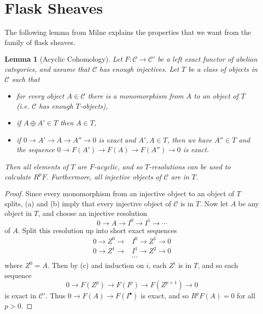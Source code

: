 \documentclass[letterpaper,11pt]{article}
\newtheorem{lem}{Lemma}
\theoremstyle{definition}
\theoremstyle{remark}
\begin{document}
\section{Flask Sheaves}

The following lemma from Milne \cite{milne} explains the properties that we want from the family of flask sheaves.

\begin{lem}[Acyclic Cohomology]\label{acyclic} Let $F:\mathcal{C}\rightarrow \mathcal{C}'$ be a left exact functor of abelian categories, and assume that $\mathcal{C}$ has enough injectives. Let $T$ be a class of objects in $\mathcal{C}$ such that
\begin{itemize}
\item[{\rm (a)}] for every object $A\in \mathcal{C}$ there is a monomorphism from $A$ to an object of $T$ (i.e. $\mathcal{C}$ has enough $T$-objects),

\item[{\rm (b)}] if $A\oplus A' \in T$ then $A \in T$,

\item[{\rm (c)}] if $0 \rightarrow A' \rightarrow A \rightarrow A'' \rightarrow 0$ is exact and $A', A \in T$, then  we have $A'' \in T$ and the sequence $0 \rightarrow F(A') \rightarrow F(A) \rightarrow F(A'') \rightarrow 0$ is exact.
\end{itemize}
Then all elements of $T$ are $F$-acyclic, and so $T$-resolutions can be used to calculate $R^pF$. Furthermore, all injective objects of $\mathcal{C}$ are in $T$.
\end{lem}
\begin{proof} Since every monomorphism from an injective object to an object of $T$ splits, (a) and (b) imply that every injective object of $\mathcal{C}$ is in $T$. Now let $A$ be any object in $T$, and choose an injective resolution
\[
0 \rightarrow A \rightarrow I^0 \rightarrow I^1 \rightarrow \cdots
\]
of $A$. Split this resolution up into short exact sequences
\begin{align*}
0 \rightarrow Z^0 \rightarrow &I^0 \rightarrow Z^1 \rightarrow 0\\
0 \rightarrow Z^1 \rightarrow &I^1 \rightarrow Z^2 \rightarrow 0\\
&\cdots
\end{align*}
where $Z^0 = A$. Then by (c) and induction on $i$, each $Z^i$ is in $T$, and so each sequence
\[
0 \rightarrow F(Z^p) \rightarrow F(I^p) \rightarrow F(Z^{p+1}) \rightarrow 0
\]
is exact in $\mathcal{C'}$. Thus $0 \rightarrow F(A) \rightarrow F(I^\bullet)$ is exact, and so $R^pF(A) = 0$ for all $p > 0$.
\end{proof}
\end{document}
